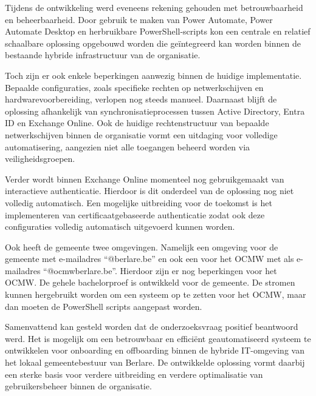 Tijdens de ontwikkeling werd eveneens rekening gehouden met betrouwbaarheid en beheerbaarheid. Door gebruik te maken van Power Automate, Power Automate Desktop en herbruikbare PowerShell-scripts kon een centrale en relatief schaalbare oplossing opgebouwd worden die geïntegreerd kan worden binnen de bestaande hybride infrastructuur van de organisatie.\newline

Toch zijn er ook enkele beperkingen aanwezig binnen de huidige implementatie. Bepaalde configuraties, zoals specifieke rechten op netwerkschijven en hardwarevoorbereiding, verlopen nog steeds manueel. Daarnaast blijft de oplossing afhankelijk van synchronisatieprocessen tussen Active Directory, Entra ID en Exchange Online. Ook de huidige rechtenstructuur van bepaalde netwerkschijven binnen de organisatie vormt een uitdaging voor volledige automatisering, aangezien niet alle toegangen beheerd worden via veiligheidsgroepen.

Verder wordt binnen Exchange Online momenteel nog gebruikgemaakt van interactieve authenticatie. Hierdoor is dit onderdeel van de oplossing nog niet volledig automatisch. Een mogelijke uitbreiding voor de toekomst is het implementeren van certificaatgebaseerde authenticatie zodat ook deze configuraties volledig automatisch uitgevoerd kunnen worden. \newline

Ook heeft de gemeente twee omgevingen. Namelijk een omgeving voor de gemeente met e-mailadres ``@berlare.be'' en ook een voor het OCMW met als e-mail\-adres ``@ocmwberlare.be''. Hierdoor zijn er nog beperkingen voor het OCMW. De gehele bachelorproef is ontwikkeld voor de gemeente. De stromen kunnen hergebruikt worden om een systeem op te zetten voor het OCMW, maar dan moeten de PowerShell scripts aangepast worden. \newline

Samenvattend kan gesteld worden dat de onderzoeksvraag positief beantwoord werd. Het is mogelijk om een betrouwbaar en efficiënt geautomatiseerd systeem te ontwikkelen voor onboarding en offboarding binnen de hybride IT-omgeving van het lokaal gemeentebestuur van Berlare. De ontwikkelde oplossing vormt daarbij een sterke basis voor verdere uitbreiding en verdere optimalisatie van gebruikersbeheer binnen de organisatie.
